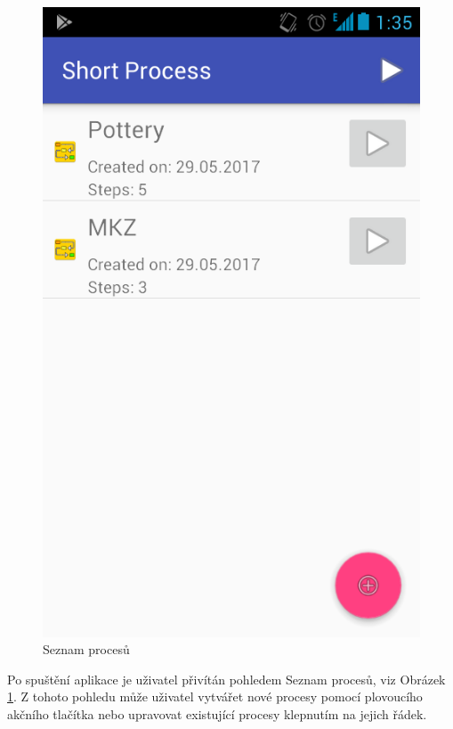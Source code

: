 \documentclass[12pt,a4paper]{article}
\begin{document}
\begin{figure}[h]
	\centering
	\includegraphics[width=0.4\linewidth]{img/fig_processList.png}
	\caption{Seznam procesů}
	\label{fig:processList}
\end{figure}

Po spuštění aplikace je uživatel přivítán pohledem Seznam procesů, viz Obrázek \ref{fig:processList}. Z tohoto pohledu může uživatel vytvářet nové procesy pomocí plovoucího akčního tlačítka nebo upravovat existující procesy klepnutím na jejich řádek.
\end{document}
